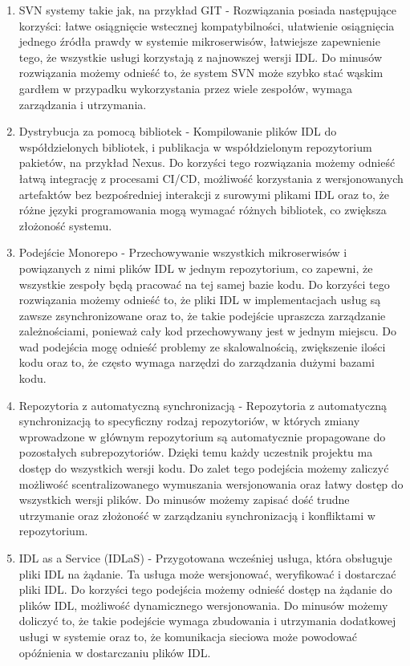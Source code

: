 \documentclass[runningheads,12pt]{llncs}
\begin{document}
\begin{enumerate}
    \item SVN systemy takie jak, na przykład GIT - Rozwiązania posiada następujące korzyści: łatwe osiągnięcie wstecznej kompatybilności, ułatwienie osiągnięcia jednego źródła prawdy w systemie mikroserwisów, łatwiejsze zapewnienie tego, że wszystkie usługi korzystają z najnowszej wersji IDL. Do minusów rozwiązania możemy odnieść to, że system SVN może szybko stać wąskim gardłem w przypadku wykorzystania przez wiele zespołów, wymaga zarządzania i utrzymania.
    \item Dystrybucja za pomocą bibliotek - Kompilowanie plików IDL do współdzielonych bibliotek, i publikacja w współdzielonym repozytorium pakietów, na przykład Nexus. Do korzyści tego rozwiązania możemy odnieść łatwą integrację z procesami CI/CD, możliwość korzystania z wersjonowanych artefaktów bez bezpośredniej interakcji z surowymi plikami IDL oraz to, że różne języki programowania mogą wymagać różnych bibliotek, co zwiększa złożoność systemu.
    \item Podejście Monorepo - Przechowywanie wszystkich mikroserwisów i powiązanych z nimi plików IDL w jednym repozytorium, co zapewni, że wszystkie zespoły będą pracować na tej samej bazie kodu. Do korzyści tego rozwiązania możemy odnieść to, że pliki IDL w implementacjach usług są zawsze zsynchronizowane oraz to, że takie podejście upraszcza zarządzanie zależnościami, ponieważ cały kod przechowywany jest w jednym miejscu. Do wad podejścia mogę odnieść problemy ze skalowalnością, zwiększenie ilości kodu oraz to, że często wymaga narzędzi do zarządzania dużymi bazami kodu.
    \item Repozytoria z automatyczną synchronizacją - Repozytoria z automatyczną synchronizacją to specyficzny rodzaj repozytoriów, w których zmiany wprowadzone w głównym repozytorium są automatycznie propagowane do pozostałych subrepozytoriów. Dzięki temu każdy uczestnik projektu ma dostęp do wszystkich wersji kodu. Do zalet tego podejścia możemy zaliczyć możliwość scentralizowanego wymuszania wersjonowania oraz łatwy dostęp do wszystkich wersji plików. Do minusów możemy zapisać dość trudne utrzymanie oraz złożoność w zarządzaniu synchronizacją i konfliktami w repozytorium.
    \item IDL as a Service (IDLaS) - Przygotowana wcześniej usługa, która obsługuje pliki IDL na żądanie. Ta usługa może wersjonować, weryfikować i dostarczać pliki IDL. Do korzyści tego podejścia możemy odnieść dostęp na żądanie do plików IDL, możliwość dynamicznego wersjonowania. Do minusów możemy doliczyć to, że takie podejście wymaga zbudowania i utrzymania dodatkowej usługi w systemie oraz to, że komunikacja sieciowa może powodować opóźnienia w dostarczaniu plików IDL.
\end{enumerate}
\end{document}
